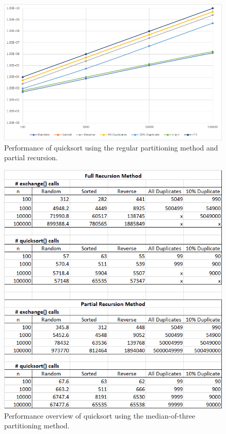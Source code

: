 \documentclass[11pt]{article}
\begin{document}
\begin{figure} [htbp!]
	\centering
	\includegraphics[width=\textwidth]{regPart}
	\caption{Performance of quicksort using the regular partitioning method and partial recursion. }
\end{figure}

\begin{figure} [htbp!]
	\centering
	\includegraphics[width=6in]{3Part-table}
	\caption{Performance overview of quicksort using the median-of-three partitioning method.}
\end{figure}
\end{document}
